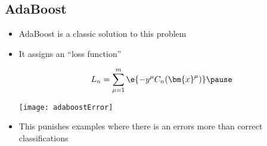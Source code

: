 
\begin{slide}
\section[-2]{AdaBoost}

\begin{PauseHighLight}
  \begin{itemize}
  \item AdaBoost is a classic solution to this problem\pause
  \item It assigns an ``loss function''\\
    \begin{minipage}{0.48\linewidth}
      \begin{align*}
        L_n = \sum_{\mu=1}^m \e{-y^\mu C_n(\bm{x}^\mu)}\pause
      \end{align*}
    \end{minipage}\hfil
    \begin{minipage}{0.48\linewidth}
      \texttt{[image: adaboostError]}
    \end{minipage}
  \item This punishes examples where there is an errors more than
    correct classifications\pause
  \end{itemize}
\end{PauseHighLight}

\end{slide}


\newcommand{\plfive}[1]{\pauselevel{=5}\pause #1 \pauselevel{build =1 :5}\pause\pauselevel{=5}}
\newcommand{\plsix}[1]{\pauselevel{=5}\pause #1 \pauselevel{build =6}\pause\pauselevel{=5}}

